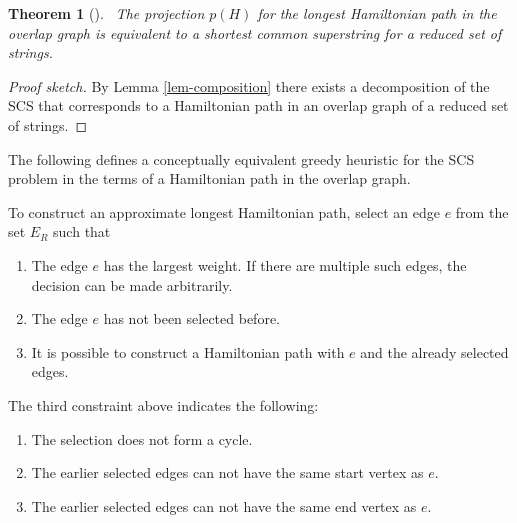 \documentclass[english,twoside,censored,csm,algorithms-track-2020]{HYthesisML}
\theoremstyle{plain}
\newtheorem{theorem}{Theorem}[chapter]
\theoremstyle{definition}
\begin{document}
\begin{theorem} [] ~\label{lem-similarity-between-SCS-Hamp}
  The projection $p(H)$ for the longest Hamiltonian path in the overlap graph is equivalent to
  a shortest common superstring for a reduced set of strings.
\end{theorem}
\begin{proof}[Proof sketch]
By Lemma \ref{lem-composition} there exists a decomposition of the SCS that corresponds to a
Hamiltonian path in an overlap graph of a reduced set of strings.
\end{proof}

The following defines a conceptually equivalent greedy heuristic for the SCS problem in the terms of
a Hamiltonian path in the overlap graph.

To  construct an approximate longest Hamiltonian path, select an edge $e$ from the set $E_R$ such that

\begin{enumerate}
\item The edge $e$ has the largest weight. If there are multiple such edges, the decision can be made arbitrarily.
\item The edge $e$ has not been selected before.
\item It is possible to construct a Hamiltonian path with $e$ and the already selected edges. 
\end{enumerate}

The third constraint above indicates the following:
\begin{enumerate}[label=\roman*]
\item The selection does not form a cycle.
\item The earlier selected edges can not have the same start vertex as $e$.
\item The earlier selected edges can not have the same end vertex as $e$.
\end{enumerate}





\end{document}
